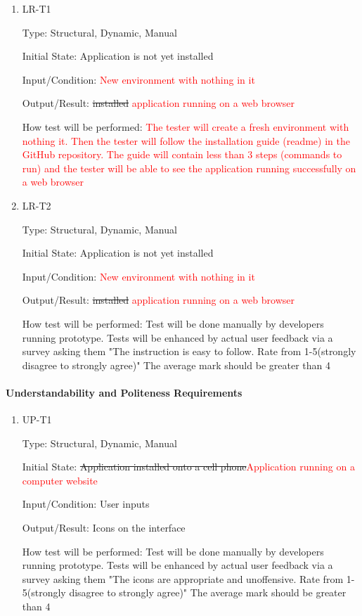 \documentclass[12pt, titlepage]{article}
\begin{document}
\begin{enumerate}

\item{LR-T1\\}

Type: Structural, Dynamic, Manual
					
Initial State: Application is not yet installed
					
Input/Condition: \textcolor{red}{New environment with nothing in it}
					
Output/Result: \sout{installed} \textcolor{red}{application running on a web browser}
					
How test will be performed: \textcolor{red}{The tester will create a fresh environment with nothing it. Then the tester will follow the installation guide (readme) in the GitHub repository. The guide will contain less than 3 steps (commands to run) and the tester will be able to see the application running successfully on a web browser}
					
\item{LR-T2\\}

Type: Structural, Dynamic, Manual
					
Initial State: Application is not yet installed
					
Input/Condition: \textcolor{red}{New environment with nothing in it}
					
Output/Result: \sout{installed} \textcolor{red}{application running on a web browser}
					
How test will be performed: Test will be done manually by developers running prototype. Tests will be enhanced by actual user feedback via a survey asking them "The instruction is easy to follow. Rate from 1-5(strongly disagree to strongly agree)" The average mark should be greater than 4

\end{enumerate}

\paragraph{Understandability and Politeness Requirements}

\begin{enumerate}

\item{UP-T1\\}

Type: Structural, Dynamic, Manual
					
Initial State: \sout{Application installed onto a cell phone}\textcolor{red}{Application running on a computer website}
					
Input/Condition: User inputs
					
Output/Result: Icons on the interface
					
How test will be performed: Test will be done manually by developers running prototype. Tests will be enhanced by actual user feedback via a survey asking them "The icons are appropriate and unoffensive. Rate from 1-5(strongly disagree to strongly agree)" The average mark should be greater than 4

\end{enumerate}
\end{document}
